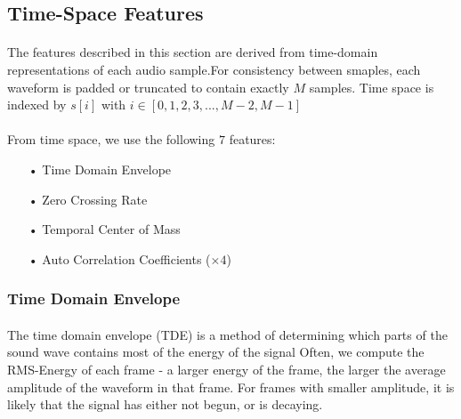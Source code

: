 \documentclass[12pt,letterpaper]{article}
\begin{document}

\newpage

\subsection{Time-Space Features}
\label{subsec-time}

\paragraph*{}The features described in this section are derived from time-domain representations of each audio sample.For consistency between smaples, each waveform is padded or truncated to contain exactly $M$ samples. Time space is indexed by $s[i]$ with $i \in [0,1,2,3,...,M-2,M-1]$


\paragraph*{}From time space, we use the following $7$ features:
\begin{itemize}
\item[•] Time Domain Envelope
\item[•] Zero Crossing Rate
\item[•] Temporal Center of Mass
\item[•] Auto Correlation Coefficients ($\times 4$)
\end{itemize}


\subsubsection{Time Domain Envelope}

\paragraph*{}The time domain envelope (TDE) is a method of determining which parts of the sound wave contains most of the energy of the signal Often, we compute the RMS-Energy of each frame - a larger energy of the frame, the larger the average amplitude of the waveform in that frame. For frames with smaller amplitude, it is likely that the signal has either not begun, or is decaying. 
\end{document}
